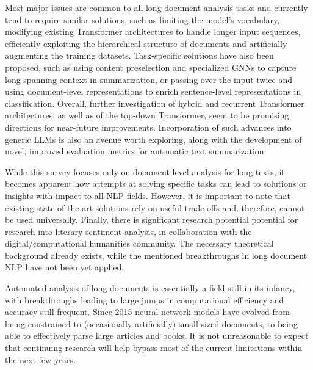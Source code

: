 \documentclass[preprint,review,10pt]{elsarticle}
\begin{document}
	Most major issues are common to all long document analysis tasks and currently tend to require similar solutions, such as limiting the model's vocabulary, modifying existing Transformer architectures to handle longer input sequences, efficiently exploiting the hierarchical structure of documents and artificially augmenting the training datasets. Task-specific solutions have also been proposed, such as using content preselection and specialized GNNs to capture long-spanning context in summarization, or passing over the input twice and using document-level representations to enrich sentence-level representations in classification. Overall, further investigation of hybrid and recurrent Transformer architectures, as well as of the top-down Transformer, seem to be promising directions for near-future improvements. Incorporation of such advances into generic LLMs is also an avenue worth exploring, along with the development of novel, improved evaluation metrics for automatic text summarization.
	
	While this survey focuses only on document-level analysis for long texts, it becomes apparent how attempts at solving specific tasks can lead to solutions or insights with impact to all NLP fields. However, it is important to note that existing state-of-the-art solutions rely on useful trade-offs and, therefore, cannot be used universally. Finally, there is significant research potential potential for research into literary sentiment analysis, in collaboration with the digital/computational humanities community. The necessary theoretical background already exists, while the mentioned breakthroughs in long document NLP have not been yet applied.
	
	Automated analysis of long documents is essentially a field still in its infancy, with breakthroughs leading to large jumps in computational efficiency and accuracy still frequent. Since 2015 neural network models have evolved from being constrained to (occasionally artificially) small-sized documents, to being able to effectively parse large articles and books. It is not unreasonable to expect that continuing research will help bypass most of the current limitations within the next few years.
	
	
	 
	
\end{document}
